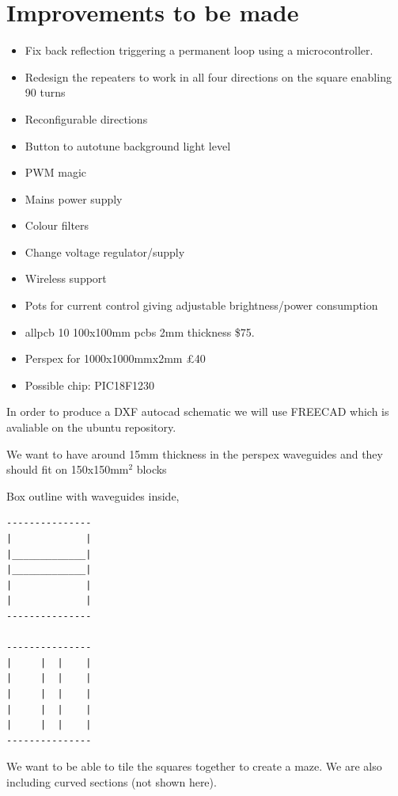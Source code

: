 \documentclass[12pt]{article}
\begin{document}
\newpage
\section{Improvements to be made}

\begin{itemize}
	\item Fix back reflection triggering a permanent loop using a microcontroller.
	\item Redesign the repeaters to work in all four directions on the square enabling 90 \degree turns 
	\item Reconfigurable directions
	\item Button to autotune background light level
	\item PWM magic
	\item Mains power supply 
	\item Colour filters
	\item Change voltage regulator/supply
	\item Wireless support
	\item Pots for current control giving adjustable brightness/power consumption	
\end{itemize}

\begin{itemize}
	\item allpcb 10 100x100mm pcbs 2mm thickness \$75.
	\item Perspex for 1000x1000mmx2mm £40
        \item Possible chip: PIC18F1230
\end{itemize}

In order to produce a DXF autocad schematic we will use FREECAD which is avaliable on the ubuntu repository.

We want to have around 15mm thickness in the perspex waveguides and they should fit on 150x150mm$^2$ blocks

Box outline with waveguides inside, 
\begin{verbatim}
---------------
|             |
|_____________|
|_____________| 
|             |
|             |
---------------

---------------
|     |  |    |
|     |  |    |
|     |  |    | 
|     |  |    |
|     |  |    |
---------------

\end{verbatim}


We want to be able to tile the squares together to create a maze. We are also including curved sections (not shown here).
\end{document}
